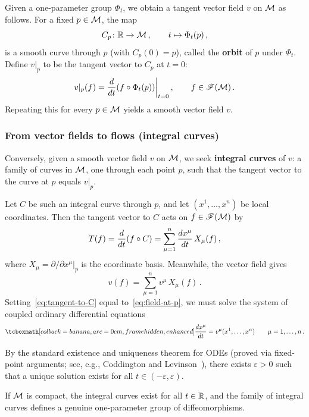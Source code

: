 Given a one-parameter group $\Phi_t$, we obtain a tangent vector
field $v$ on $\mathcal{M}$ as follows.  For a fixed $p\in\mathcal{M}$, the map
\[
  C_p\colon \mathbb{R}\to\mathcal{M}\,,\qquad t\mapsto \Phi_t(p)\,,
\]
is a smooth curve through $p$ (with $C_p(0)=p$), called the
\textbf{orbit} of $p$ under $\Phi_t$.  Define $v|_p$ to
be the tangent vector to $C_p$ at $t=0$:
\begin{equation}\label{eq:flow-to-field}
  v|_p(f) = \frac{d }{d t}(f\circ\Phi_t(p))\bigg|_{t=0}\,,
  \qquad f\in\mathscr{F}(\mathcal{M})\,.
\end{equation}
Repeating this for every $p\in\mathcal{M}$ yields a smooth vector field $v$.

\subsubsection{From vector fields to flows (integral curves)}

Conversely, given a smooth vector field $v$ on $\mathcal{M}$, we seek
\textbf{integral curves} of $v$: a family of curves in $\mathcal{M}$, one
through each point $p$, such that the tangent vector to the curve
at $p$ equals $v|_p$.

Let $C$ be such an integral curve through $p$, and let $(x^1,\dots,x^n)$
be local coordinates.  Then the tangent vector to $C$ acts on
$f\in\mathscr{F}(\mathcal{M})$ by
\begin{equation}\label{eq:tangent-to-C}
  T(f) = \frac{d }{d t}(f\circ C)
       = \sum_{\mu=1}^{n} \frac{d x^\mu}{d t}\, X_\mu(f)\,,
\end{equation}
where $X_\mu = \partial/\partial x^\mu|_p$ is the coordinate basis.
Meanwhile, the vector field gives
\begin{equation}\label{eq:field-at-p}
  v(f) = \sum_{\mu=1}^{n} v^\mu\, X_\mu(f)\,.
\end{equation}
Setting~\eqref{eq:tangent-to-C} equal to~\eqref{eq:field-at-p},
we must solve the system of coupled ordinary differential equations
\begin{equation}\label{eq:integral-curve-ode}
  \eqbox{\td{x^\mu}{t} = v^\mu(x^1,\dots,x^n)}
  \qquad \mu = 1,\dots,n\,.
\end{equation}

By the standard existence and uniqueness theorem for ODEs
(proved via fixed-point arguments; see, e.g.,
Coddington and Levinson~\cite{CL55}), there
exists $\varepsilon > 0$ such that a unique solution exists for all
$t\in(-\varepsilon,\varepsilon)$.

\begin{remark}
  If $\mathcal{M}$ is compact, the integral curves exist for all
  $t\in\mathbb{R}$, and the family of integral curves defines a genuine
  one-parameter group of diffeomorphisms.
\end{remark}

